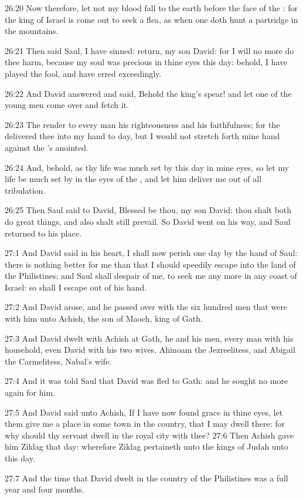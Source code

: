 26:20 Now therefore, let not my blood fall to the earth before the
face of the \LORD: for the king of Israel is come out to seek a flea,
as when one doth hunt a partridge in the mountains.

26:21 Then said Saul, I have sinned: return, my son David: for I will
no more do thee harm, because my soul was precious in thine eyes this
day: behold, I have played the fool, and have erred exceedingly.

26:22 And David answered and said, Behold the king's spear! and let
one of the young men come over and fetch it.

26:23 The \LORD render to every man his righteousness and his
faithfulness; for the \LORD delivered thee into my hand to day, but I
would not stretch forth mine hand against the \LORD's anointed.

26:24 And, behold, as thy life was much set by this day in mine eyes,
so let my life be much set by in the eyes of the \LORD, and let him
deliver me out of all tribulation.

26:25 Then Saul said to David, Blessed be thou, my son David: thou
shalt both do great things, and also shalt still prevail. So David
went on his way, and Saul returned to his place.

27:1 And David said in his heart, I shall now perish one day by the
hand of Saul: there is nothing better for me than that I should
speedily escape into the land of the Philistines; and Saul shall
despair of me, to seek me any more in any coast of Israel: so shall I
escape out of his hand.

27:2 And David arose, and he passed over with the six hundred men that
were with him unto Achish, the son of Maoch, king of Gath.

27:3 And David dwelt with Achish at Gath, he and his men, every man
with his household, even David with his two wives, Ahinoam the
Jezreelitess, and Abigail the Carmelitess, Nabal's wife.

27:4 And it was told Saul that David was fled to Gath: and he sought
no more again for him.

27:5 And David said unto Achish, If I have now found grace in thine
eyes, let them give me a place in some town in the country, that I may
dwell there: for why should thy servant dwell in the royal city with
thee?  27:6 Then Achish gave him Ziklag that day: wherefore Ziklag
pertaineth unto the kings of Judah unto this day.

27:7 And the time that David dwelt in the country of the Philistines
was a full year and four months.

